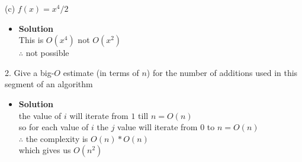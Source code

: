 \documentclass[11pt]{article}
\begin{document}
\begin{enumerate}
\begin{itemize}
\end {itemize}



\large (c) $f(x) = x^4/2$\\


\begin{itemize}

\item \textbf{Solution}\\
\large  This is $O(x^4)$ not $O(x^2)$\\
\large $\therefore $ not possible\\



\end {itemize}
\end {enumerate}



\begin{enumerate}

\begin{flushleft}
{\large 2. Give a big-$O$ estimate (in terms of $n$) for the number of additions used in this segment of an algorithm}\\
\end{flushleft}

\begin{itemize}

\item \textbf{Solution}\\
\large the value of $i$ will iterate from $1$ till $n = O(n)$\\
\large so for each value of $i$ the $j$ value will iterate from $0$ to $n = O(n)$\\
\large $\therefore$ the complexity is $O(n)*O(n)$\\
\large which gives us $O(n^2)$\\


\end {itemize}



\end {enumerate}




\pagebreak 

\end{document}
